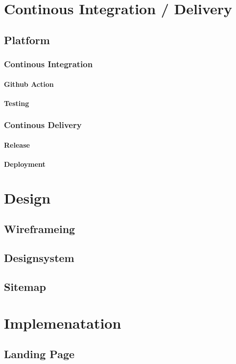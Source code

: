 \section{ Continous Integration / Delivery} 
\subsection{ Platform }
\subsubsection{ Continous Integration }
\paragraph{ Github Action }
\paragraph{ Testing }
\subsubsection{ Continous Delivery }
\paragraph{ Release }
\paragraph{ Deployment }

\section{ Design } 
\subsection{ Wireframeing}
\subsection{ Designsystem }
\subsection{ Sitemap }

\section{ Implemenatation} 
\subsection{ Landing Page } 
